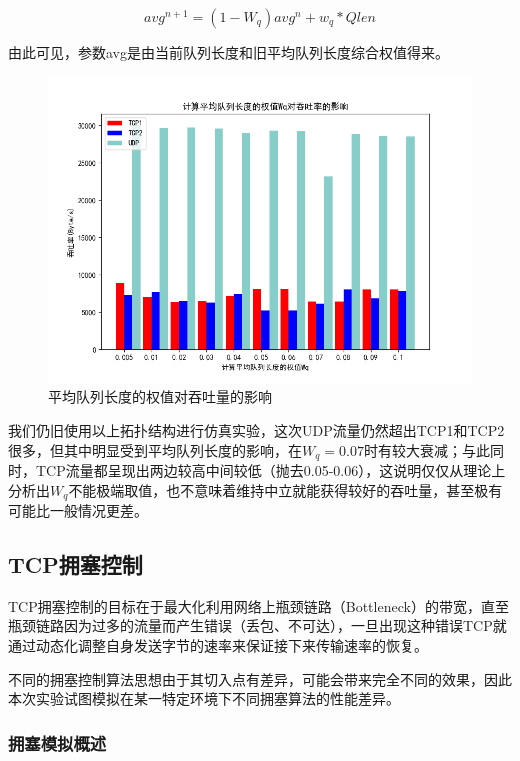 \documentclass{article}
\begin{document}
\begin{equation*}
	avg^{n+1}=(1-W_q)avg^{n}+w_q*Qlen
\end{equation*}

由此可见，参数avg是由当前队列长度和旧平均队列长度综合权值得来。

\begin{figure}[H]
	\centering
	\includegraphics[scale=0.6]{picture/Wq.png}
	\caption{平均队列长度的权值对吞吐量的影响}
	\label{fig:Wq}
\end{figure}

我们仍旧使用以上拓扑结构进行仿真实验，这次UDP流量仍然超出TCP1和TCP2很多，但其中明显受到平均队列长度的影响，在$W_q=0.07$时有较大衰减；与此同时，TCP流量都呈现出两边较高中间较低（抛去0.05-0.06），这说明仅仅从理论上分析出$W_q$不能极端取值，也不意味着维持中立就能获得较好的吞吐量，甚至极有可能比一般情况更差。

\subsection{TCP拥塞控制}

TCP拥塞控制的目标在于最大化利用网络上瓶颈链路（Bottleneck）的带宽，直至瓶颈链路因为过多的流量而产生错误（丢包、不可达），一旦出现这种错误TCP就通过动态化调整自身发送字节的速率来保证接下来传输速率的恢复。

不同的拥塞控制算法思想由于其切入点有差异，可能会带来完全不同的效果，因此本次实验试图模拟在某一特定环境下不同拥塞算法的性能差异。

\subsubsection{拥塞模拟概述}
\end{document}
